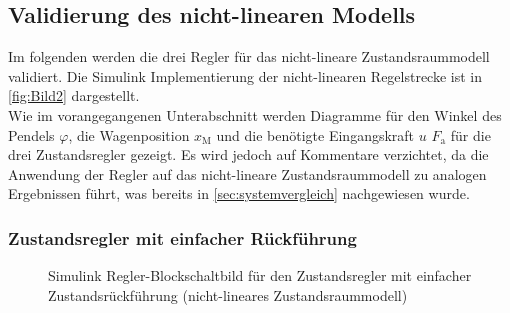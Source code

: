 \newpage

\subsection{Validierung des nicht-linearen Modells}
Im folgenden werden die drei Regler für das nicht-lineare Zustandsraummodell validiert. Die Simulink Implementierung der nicht-linearen Regelstrecke ist in \autoref{fig:Bild2} dargestellt. \\
\newline
Wie im vorangegangenen Unterabschnitt werden Diagramme für den Winkel des Pendels $\varphi$, die Wagenposition $x_{\mathrm{M}}$ und die benötigte Eingangskraft $u$ \bzw $F_{\mathrm{a}}$ für die drei Zustandsregler gezeigt. Es wird jedoch auf Kommentare verzichtet, da die Anwendung der Regler auf das nicht-lineare Zustandsraummodell zu analogen Ergebnissen führt, was bereits in \autoref{sec:systemvergleich} nachgewiesen wurde.

\subsubsection{Zustandsregler mit einfacher Rückführung}

\begin{figure}[H]
    \centering
    \caption[Zustandsregler mit einfacher Rückführung - Simulink (nicht-linear)]{Simulink Regler-Blockschaltbild für den Zustandsregler mit einfacher Zustandsrückführung (nicht-lineares Zustandsraummodell)}
    \label{fig:Bild28}
\end{figure}

